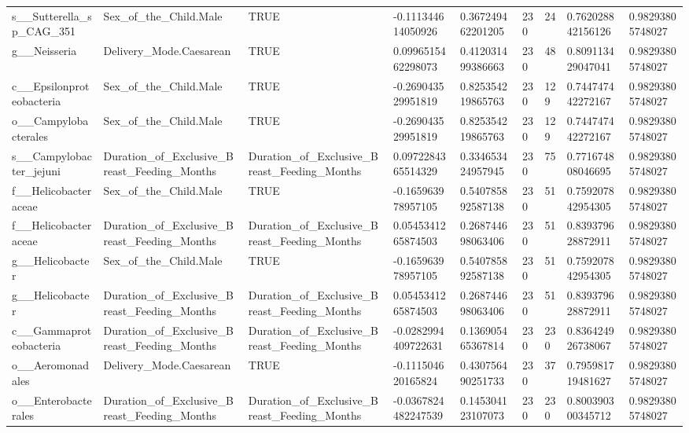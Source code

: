 \begin{longtable}{lllllllll}
s\_\_Sutterella\_sp\_CAG\_351 & Sex\_of\_the\_Child.Male & TRUE & -0.111344614050926 & 0.367249462201205 & 230 & 24 & 0.762028842156126 & 0.98293805748027 \\
g\_\_Neisseria & Delivery\_Mode.Caesarean & TRUE & 0.0996515462298073 & 0.412031499386663 & 230 & 48 & 0.809113429047041 & 0.98293805748027 \\
c\_\_Epsilonproteobacteria & Sex\_of\_the\_Child.Male & TRUE & -0.269043529951819 & 0.825354219865763 & 230 & 129 & 0.744747442272167 & 0.98293805748027 \\
o\_\_Campylobacterales & Sex\_of\_the\_Child.Male & TRUE & -0.269043529951819 & 0.825354219865763 & 230 & 129 & 0.744747442272167 & 0.98293805748027 \\
s\_\_Campylobacter\_jejuni & Duration\_of\_Exclusive\_Breast\_Feeding\_Months & Duration\_of\_Exclusive\_Breast\_Feeding\_Months & 0.0972284365514329 & 0.334653424957945 & 230 & 75 & 0.771674808046695 & 0.98293805748027 \\
f\_\_Helicobacteraceae & Sex\_of\_the\_Child.Male & TRUE & -0.165963978957105 & 0.540785892587138 & 230 & 51 & 0.759207842954305 & 0.98293805748027 \\
f\_\_Helicobacteraceae & Duration\_of\_Exclusive\_Breast\_Feeding\_Months & Duration\_of\_Exclusive\_Breast\_Feeding\_Months & 0.0545341265874503 & 0.268744698063406 & 230 & 51 & 0.839379628872911 & 0.98293805748027 \\
g\_\_Helicobacter & Sex\_of\_the\_Child.Male & TRUE & -0.165963978957105 & 0.540785892587138 & 230 & 51 & 0.759207842954305 & 0.98293805748027 \\
g\_\_Helicobacter & Duration\_of\_Exclusive\_Breast\_Feeding\_Months & Duration\_of\_Exclusive\_Breast\_Feeding\_Months & 0.0545341265874503 & 0.268744698063406 & 230 & 51 & 0.839379628872911 & 0.98293805748027 \\
c\_\_Gammaproteobacteria & Duration\_of\_Exclusive\_Breast\_Feeding\_Months & Duration\_of\_Exclusive\_Breast\_Feeding\_Months & -0.0282994409722631 & 0.136905465367814 & 230 & 230 & 0.836424926738067 & 0.98293805748027 \\
o\_\_Aeromonadales & Delivery\_Mode.Caesarean & TRUE & -0.111504620165824 & 0.430756490251733 & 230 & 37 & 0.795981719481627 & 0.98293805748027 \\
o\_\_Enterobacterales & Duration\_of\_Exclusive\_Breast\_Feeding\_Months & Duration\_of\_Exclusive\_Breast\_Feeding\_Months & -0.0367824482247539 & 0.145304123107073 & 230 & 230 & 0.800390300345712 & 0.98293805748027 \\

\end{longtable}
